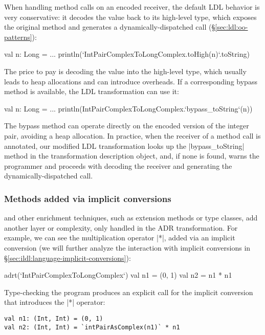 When handling method calls on an encoded receiver, the default LDL behavior is very conservative: it decodes the value back to its high-level type, which exposes the original method and generates a dynamically-dispatched call (\S\ref{sec:ldl:oo-patterns}):

\begin{lstlisting-nobreak}
val n: Long = ...
println(`IntPairComplexToLongComplex.toHigh(n)`.toString)
\end{lstlisting-nobreak}

The price to pay is decoding the value into the high-level type, which usually leads to heap allocations and can introduce overheads. If a corresponding bypass method is available, the LDL transformation can use it:

\begin{lstlisting-nobreak}
val n: Long = ...
println(IntPairComplexToLongComplex.`bypass_toString`(n))
\end{lstlisting-nobreak}

The bypass method can operate directly on the encoded version of the integer pair, avoiding a heap allocation. In practice, when the receiver of a method call is annotated, our modified LDL transformation looks up the |bypass_toString| method in the transformation description object, and, if none is found, warns the programmer and proceeds with decoding the receiver and generating the dynamically-dispatched call.


\subsubsection*{Methods added via implicit conversions} and other enrichment techniques, such as extension methods or type classes, add another layer or complexity, only handled in the ADR transformation. For example, we can see the multiplication operator |*|, added via an implicit conversion (we will further analyze the interaction with implicit conversions in \S\ref{sec:ildl:language-implicit-conversions}):

\begin{lstlisting-nobreak}
adrt(`IntPairComplexToLongComplex`) {
  val n1 = (0, 1)
  val n2 = n1 * n1
}
\end{lstlisting-nobreak}

Type-checking the program produces an explicit call for the implicit conversion that introduces the |*| operator:


\begin{lstlisting}
val n1: (Int, Int) = (0, 1)
val n2: (Int, Int) = `intPairAsComplex(n1)` * n1
\end{lstlisting}

